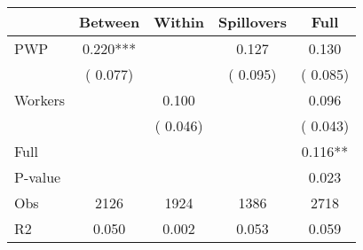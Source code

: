 
\begin{tabular}{l*{4}{c}}\hline&\multicolumn{1}{c}{Between}&\multicolumn{1}{c}{Within}&\multicolumn{1}{c}{Spillovers}&\multicolumn{1}{c}{Full}\\ \hline
 PWP           &              0.220***      &                                               &        0.127 &         0.130                            \\ 
                               &        (       0.077)           &                                       &       (       0.095)     &      (       0.085)                                           \\ 
 Workers       &                                               &        0.100    &                                &             0.096                            \\ 
                               &                                               & (       0.046)                  &                                        &      (       0.043)                                           \\ 
\hline                                                                                                                                                                                                                                            
 Full                  &                                               &                                               &                                        &             0.116**                                     \\ 
 P-value               &                                               &                                               &                                        &             0.023                                           \\ 
 Obs                   &               2126               &       1924                       &       1386                &              2718                                               \\ 
 R2                    &                      0.050              &              0.002                      &              0.053               &                     0.059                                              \\ 
\hline \end{tabular}                                                                                                                                                                                                              